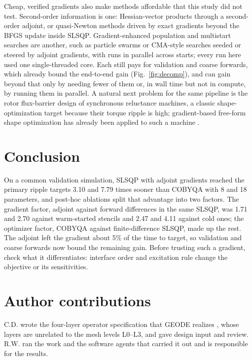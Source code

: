 \documentclass{anvil-paper}
\begin{document}
Cheap, verified gradients also make methods affordable that this study did
not test. Second-order information is one: Hessian-vector products through a
second-order adjoint, or quasi-Newton methods driven by exact gradients beyond
the BFGS update inside SLSQP. Gradient-enhanced population and multistart
searches are another, such as particle swarms or CMA-style searches seeded or
steered by adjoint gradients, with runs in parallel across starts; every run
here used one single-threaded core. Each still pays for validation and coarse
forwards, which already bound the end-to-end gain (Fig.~\ref{fig:decomp}), and
can gain beyond that only by needing fewer of them or, in wall time but not in
compute, by running them in parallel. A natural next problem for the same
pipeline is the rotor flux-barrier design of synchronous reluctance machines,
a classic shape-optimization target because their torque ripple is high;
gradient-based free-form shape optimization has already been applied to such a
machine \citep{gangl2022multi}.

\section{Conclusion}
On a common validation simulation, SLSQP with adjoint gradients reached the
primary ripple targets 3.10 and 7.79 times sooner than COBYQA with 8 and 18
parameters, and post-hoc ablations split that advantage into two factors.
The gradient factor, adjoint against forward differences in the same
SLSQP, was 1.71 and 2.70 against warm-started stencils and 2.47 and 4.11
against cold ones; the optimizer factor, COBYQA against finite-difference
SLSQP, made up the rest. The adjoint left the gradient about 5\% of the
time to target, so validation and coarse forwards now bound the
remaining gain. Before trusting such a gradient, check what it
differentiates: interface order and excitation rule change the objective
or its sensitivities.

\section*{Author contributions}
C.D. wrote the four-layer operator specification that GEODE realizes
\citep{dunnavant2026whiteroom}, whose layers are unrelated to the mesh
levels L0--L3, and gave design input and review. R.W. ran the work and the
software agents that carried it out and is responsible for the results.
\end{document}
